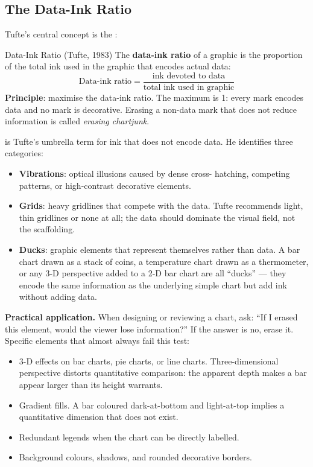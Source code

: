 \subsection{The Data-Ink Ratio}
\label{subsec:data-ink}

Tufte's central concept is the :

\begin{defbox}{Data-Ink Ratio (Tufte, 1983)}
The \textbf{data-ink ratio} of a graphic is the proportion of the total
ink used in the graphic that encodes actual data:
\[
  \text{Data-ink ratio} =
  \frac{\text{ink devoted to data}}{\text{total ink used in graphic}}
\]
\textbf{Principle}: maximise the data-ink ratio. The maximum is 1: every
mark encodes data and no mark is decorative. Erasing a non-data mark
that does not reduce information is called \emph{erasing chartjunk}.
\end{defbox}

 is Tufte's umbrella term for ink that does not encode
data. He identifies three categories:
\begin{itemize}
  \item \textbf{Vibrations}: optical illusions caused by dense cross-
        hatching, competing patterns, or high-contrast decorative elements.
  \item \textbf{Grids}: heavy gridlines that compete with the data.
        Tufte recommends light, thin gridlines or none at all; the data
        should dominate the visual field, not the scaffolding.
  \item \textbf{Ducks}: graphic elements that represent themselves rather
        than data. A bar chart drawn as a stack of coins, a temperature
        chart drawn as a thermometer, or any 3-D perspective added to a
        2-D bar chart are all ``ducks'' --- they encode the same information
        as the underlying simple chart but add ink without adding data.
\end{itemize}

\textbf{Practical application.} When designing or reviewing a chart, ask:
``If I erased this element, would the viewer lose information?'' If the
answer is no, erase it. Specific elements that almost always fail this test:
\begin{itemize}
  \item 3-D effects on bar charts, pie charts, or line charts.
        Three-dimensional perspective distorts quantitative comparison:
        the apparent depth makes a bar appear larger than its height warrants.
  \item Gradient fills. A bar coloured dark-at-bottom and light-at-top
        implies a quantitative dimension that does not exist.
  \item Redundant legends when the chart can be directly labelled.
  \item Background colours, shadows, and rounded decorative borders.
\end{itemize}

